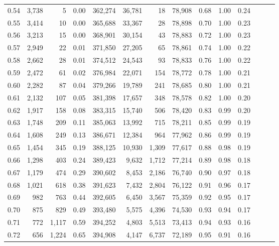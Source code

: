 \begin{tabular}{rrrrrrrrrrrrrr}
0.54 &  3,738 &      5 &  0.00 &  362,274 &   36,781 &      18 &  78,908 &  0.68 &  1.00 &      0.24 \\
0.55 &  3,414 &     10 &  0.00 &  365,688 &   33,367 &      28 &  78,898 &  0.70 &  1.00 &      0.23 \\
0.56 &  3,213 &     15 &  0.00 &  368,901 &   30,154 &      43 &  78,883 &  0.72 &  1.00 &      0.23 \\
0.57 &  2,949 &     22 &  0.01 &  371,850 &   27,205 &      65 &  78,861 &  0.74 &  1.00 &      0.22 \\
0.58 &  2,662 &     28 &  0.01 &  374,512 &   24,543 &      93 &  78,833 &  0.76 &  1.00 &      0.22 \\
0.59 &  2,472 &     61 &  0.02 &  376,984 &   22,071 &     154 &  78,772 &  0.78 &  1.00 &      0.21 \\
0.60 &  2,282 &     87 &  0.04 &  379,266 &   19,789 &     241 &  78,685 &  0.80 &  1.00 &      0.21 \\
0.61 &  2,132 &    107 &  0.05 &  381,398 &   17,657 &     348 &  78,578 &  0.82 &  1.00 &      0.20 \\
0.62 &  1,917 &    158 &  0.08 &  383,315 &   15,740 &     506 &  78,420 &  0.83 &  0.99 &      0.20 \\
0.63 &  1,748 &    209 &  0.11 &  385,063 &   13,992 &     715 &  78,211 &  0.85 &  0.99 &      0.19 \\
0.64 &  1,608 &    249 &  0.13 &  386,671 &   12,384 &     964 &  77,962 &  0.86 &  0.99 &      0.19 \\
0.65 &  1,454 &    345 &  0.19 &  388,125 &   10,930 &   1,309 &  77,617 &  0.88 &  0.98 &      0.19 \\
0.66 &  1,298 &    403 &  0.24 &  389,423 &    9,632 &   1,712 &  77,214 &  0.89 &  0.98 &      0.18 \\
0.67 &  1,179 &    474 &  0.29 &  390,602 &    8,453 &   2,186 &  76,740 &  0.90 &  0.97 &      0.18 \\
0.68 &  1,021 &    618 &  0.38 &  391,623 &    7,432 &   2,804 &  76,122 &  0.91 &  0.96 &      0.17 \\
0.69 &    982 &    763 &  0.44 &  392,605 &    6,450 &   3,567 &  75,359 &  0.92 &  0.95 &      0.17 \\
0.70 &    875 &    829 &  0.49 &  393,480 &    5,575 &   4,396 &  74,530 &  0.93 &  0.94 &      0.17 \\
0.71 &    772 &  1,117 &  0.59 &  394,252 &    4,803 &   5,513 &  73,413 &  0.94 &  0.93 &      0.16 \\
0.72 &    656 &  1,224 &  0.65 &  394,908 &    4,147 &   6,737 &  72,189 &  0.95 &  0.91 &      0.16 \\

\end{tabular}

